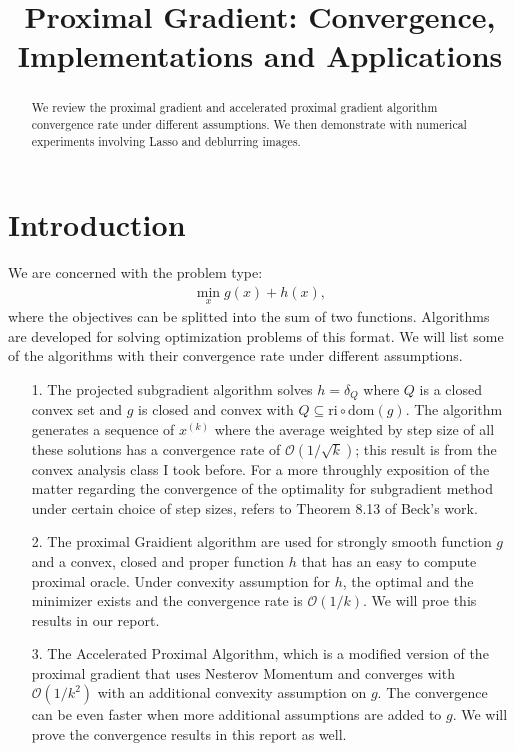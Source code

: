 \documentclass[]{article}
\theoremstyle{definition}
\begin{document}
\title{Proximal Gradient: Convergence, Implementations and Applications}
\maketitle
\begin{abstract}
    We review the proximal gradient and accelerated proximal gradient algorithm convergence rate under different assumptions. We then demonstrate with numerical experiments involving Lasso and deblurring images. 
\end{abstract}

\section{Introduction}
    We are concerned with the problem type: 
    \begin{align}
        \min_{x} g(x) + h(x),
    \end{align}
    where the objectives can be splitted into the sum of two functions. Algorithms are developed for solving optimization problems of this format. We will list some of the algorithms with their convergence rate under different assumptions. 
    \begin{enumerate}
        \item [1.] The projected subgradient algorithm solves $h = \delta_Q$ where $Q$ is a closed convex set and $g$ is closed and convex with $Q\subseteq\text{ri}\circ \text{dom}(g)$. The algorithm generates a sequence of $x^{(k)}$ where the average weighted by step size of all these solutions has a convergence rate of $\mathcal O(1/\sqrt{k})$; this result is from the convex analysis class I took before. For a more throughly exposition of the matter regarding the convergence of the optimality for subgradient method under certain choice of step sizes, refers to Theorem 8.13 of Beck's work\cite{book:first_order_opt}. 
        \item [2.] The proximal Graidient algorithm are used for strongly smooth function $g$ and a convex, closed and proper function $h$ that has an easy to compute proximal oracle. Under convexity assumption for $h$, the optimal and the minimizer exists and the convergence rate is $\mathcal O(1/k)$. We will proe this results in our report. 
        \item [3.] The Accelerated Proximal Algorithm, which is a modified version of the proximal gradient that uses Nesterov Momentum and converges with $\mathcal O(1/k^2)$ with an additional convexity assumption on $g$. The convergence can be even faster when more additional assumptions are added to $g$. We will prove the convergence results in this report as well.  
    \end{enumerate}
\end{document}
